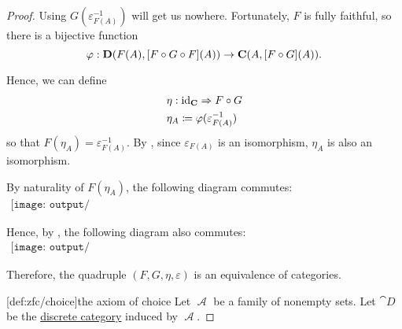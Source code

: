 \begin{proof}
  Using \( G(\varepsilon_{F(A)}^{-1}) \) will get us nowhere. Fortunately, \( F \) is fully faithful, so there is a bijective function
  \begin{equation*}
    \varphi: \cat{D}(F(A), [F \bincirc G \bincirc F](A)) \to \cat{C}(A, [F \bincirc G](A)).
  \end{equation*}

  Hence, we can define
  \begin{equation*}
    \begin{aligned}
      &\eta: \id_{\cat{C}} \Rightarrow F \bincirc G \\
      &\eta_A \coloneqq \varphi(\varepsilon_{F(A)}^{-1})
    \end{aligned}
  \end{equation*}
  so that \( F(\eta_A) = \varepsilon_{F(A)}^{-1} \). By , since \( \varepsilon_{F(A)} \) is an isomorphism, \( \eta_A \) is also an isomorphism.

  By naturality of \( F(\eta_A) \), the following diagram commutes:
  \begin{equation}\label{eq:thm:fully_faithful_and_essentially_surjective_functor_induces_equivalence/varepsilon_image_nat}
    \begin{aligned}
      \texttt{[image: output/thm\_\_fully\_faithful\_and\_essentially\_surjective\_functor\_induces\_equivalence]}
    \end{aligned}
  \end{equation}

  Hence, by , the following diagram also commutes:
  \begin{equation}\label{eq:thm:fully_faithful_and_essentially_surjective_functor_induces_equivalence/varepsilon_source_nat}
    \begin{aligned}
      \texttt{[image: output/thm\_\_fully\_faithful\_and\_essentially\_surjective\_functor\_induces\_equivalence]}
    \end{aligned}
  \end{equation}

  Therefore, the quadruple \( (F, G, \eta, \varepsilon) \) is an equivalence of categories.

  [def:zfc/choice]{the axiom of choice} Let \( \mscrA \) be a family of nonempty sets. Let \( \cat{D} \) be the \hyperref[def:discrete_category]{discrete category} induced by \( \mscrA \).


\end{proof}
